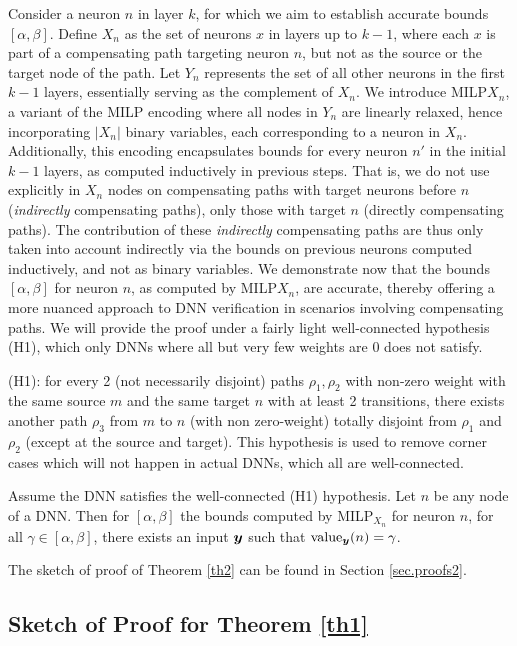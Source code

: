 Consider a neuron $n$ in layer $k$, for which we aim to establish accurate bounds $[\alpha,\beta]$. Define $X_n$ as the set of neurons $x$ in layers up to $k-1$, where each $x$ is part of a compensating path targeting neuron $n$, but not as the source or the target node of the path. Let $Y_n$ represents the set of all other neurons in the first $k-1$ layers, essentially serving as the complement of $X_n$. We introduce MILP${X_n}$, a variant of the MILP encoding where all nodes in $Y_n$ are linearly relaxed, hence incorporating $|X_n|$ binary variables, each corresponding to a neuron in $X_n$. Additionally, this encoding encapsulates bounds for every neuron $n'$ in the initial $k-1$ layers, as computed inductively in previous steps. That is, we do not use explicitly in $X_n$ nodes on compensating paths with target neurons before $n$ ({\em indirectly} compensating paths), 
only those with target $n$ ({directly} compensating paths).
The contribution of these {\em indirectly} compensating paths are thus 
only taken into account indirectly via the bounds on previous neurons computed inductively,
and not as binary variables. We demonstrate now that the bounds $[\alpha,\beta]$ for neuron $n$, as computed by MILP${X_n}$, are accurate, thereby offering a more nuanced approach to DNN verification in scenarios involving compensating paths.
We will provide the proof under a fairly light well-connected hypothesis (H1), which only DNNs where all but very few weights are 0 does not satisfy.

(H1): for every 2 (not necessarily disjoint) paths $\rho_1,\rho_2$ with non-zero weight with the same source $m$ and the same target $n$ with at least 2 transitions, there exists another path $\rho_3$ from $m$ to $n$ (with non zero-weight) totally disjoint from $\rho_1$ and $\rho_2$ (except at the source and target). This hypothesis is used to remove corner cases which will not happen in actual DNNs, which all are well-connected.


\begin{theorem}
	\label{th2} 
	Assume the DNN satisfies the well-connected (H1) hypothesis.
	Let $n$ be any node of a DNN. Then for $[\alpha,\beta]$ the bounds computed by MILP$_{X_n}$ for neuron $n$, for all $\gamma \in [\alpha,\beta]$, there exists an input $\boldsymbol{y}$ such that ${\textrm{value}}_{\boldsymbol{y}}(n)=\gamma$.
\end{theorem}

The sketch of proof of Theorem \ref{th2} can be found in Section \ref{sec.proofs2}.


\subsection{Sketch of Proof for Theorem \ref{th1}}
\label{sec.proofs}

